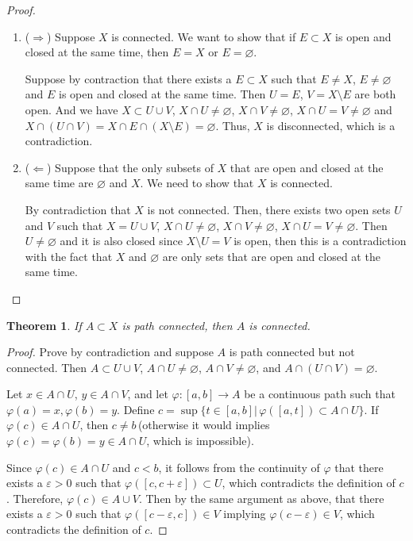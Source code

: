 \documentclass[12pt,leqno]{amsart}
\newtheorem{theorem}{Theorem}[section]
\theoremstyle{definition}
\numberwithin{equation}{subsection}
\begin{document}
\begin{proof}
~\begin{enumerate}
    \item ($\Rightarrow$) Suppose $X$ is connected. We want to show that if $E\subset X$ is open and closed at the same time, then $E = X$ or $E = \varnothing$. 
    
    Suppose by contraction that there exists a $E\subset X$ such that $E\neq X$, $E\neq\varnothing$ and $E$ is open and closed at the same time. Then $U = E$, $V = X\setminus E$ are both open. And we have $X \subset U\cup V$, $X\cap U \neq \varnothing$, $X\cap V \neq \varnothing$, $X\cap U = V \neq \varnothing$ and $X\cap (U\cap V) = X\cap E\cap (X\setminus E) = \varnothing$. Thus, $X$ is disconnected, which is a contradiction.
    \item ($\Leftarrow$) Suppose that the only subsets of $X$ that are open and closed at the same time are $\varnothing$ and $X$. We need to show that $X$ is connected. 
    
    By contradiction that $X$ is not connected. Then, there exists two open sets $U$ and $V$ such that $X = U\cup V$, $X\cap U \neq \varnothing$, $X\cap V \neq \varnothing$, $X\cap U = V \neq \varnothing$. Then $U\neq \varnothing$ and it is also closed since $X\setminus U = V$ is open, then this is a contradiction with the fact that $X$ and $\varnothing$ are only sets that are open and closed at the same time.
\end{enumerate}
\end{proof}

\medskip

\begin{theorem}
If $A\subset X$ is path connected, then $A$ is connected.
\end{theorem}
\begin{proof}
Prove by contradiction and suppose $A$ is path connected but not connected. Then $A \subset U\cup V$, $A\cap U\neq\varnothing$, $A\cap V\neq\varnothing$, and $A\cap (U\cap V)=\varnothing$. 

Let $x\in A\cap U$, $y\in A\cap V$, and let $\varphi:[a,b]\rightarrow A$ be a continuous path such that $\varphi(a) = x, \varphi(b) = y$. Define $c = \sup\{t\in[a,b]|\, \varphi\left([a,t]\right)\subset A\cap U\}$. If $\varphi(c)\in A\cap U$, then $c\neq b$\,(otherwise it would implies $\varphi(c) = \varphi(b) = y \in A\cap U$, which is impossible). 

Since $\varphi(c)\in A\cap U$ and $c<b$, it follows from the continuity of $\varphi$ that there exists a $\varepsilon > 0$ such that $\varphi\left([c,c+\varepsilon]\right)\subset U$, which contradicts the definition of $c$. Therefore, $\varphi(c)\in A\cup V$. Then by the same argument as above, that there exists a $\varepsilon>0$ such that $\varphi([c-\varepsilon,c])\in V$ implying $\varphi(c-\varepsilon)\in V$, which contradicts the definition of $c$.
\end{proof}
\end{document}
